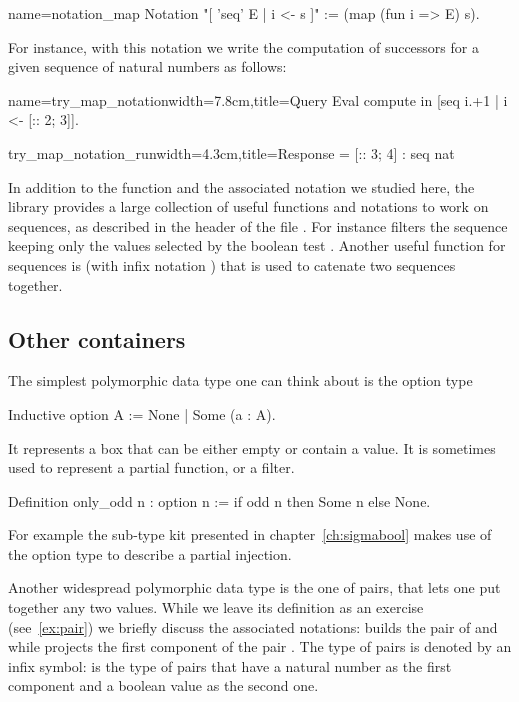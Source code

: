 \begin{coq}{name=notation_map}{}
Notation "[ 'seq' E | i <- s ]" := (map (fun i => E) s).
\end{coq}
For instance, with this notation we write the computation of successors
for a given sequence of natural numbers as follows:

\begin{coq}{name=try_map_notation}{width=7.8cm,title=Query}
Eval compute in [seq i.+1 | i <- [:: 2; 3]].
\end{coq}
\begin{coqout}{try_map_notation_run}{width=4.3cm,title=Response}
= [:: 3; 4] : seq nat
\end{coqout}
\index[coq]{\C{[seq .. "| .. <- ..]}}
In addition to the function  and the associated notation
we studied here, the \mcbMC{} library
provides a large collection of useful functions and notations to work on
sequences, as described in the header of the file .  For
instance \C{[seq i <- s | p]} filters the sequence  keeping only
the values selected by the boolean test .
Another useful function for sequences is  (with infix notation \C{++})
that is used to catenate two sequences together.
\index[coq]{\C{(_ ++ _)}}
\index[coq]{\C{[seq .. <- .. "| ..]}}

\subsection{Other containers}\label{sec:othercontainers}
The simplest polymorphic data type one can think about is the option type

\begin{coq}{}{}
Inductive option A := None | Some (a : A).
\end{coq}
It represents a box that can be either empty or contain a value.
It is sometimes used to represent a partial function, or a filter.

\begin{coq}{}{}
Definition only_odd n : option n := if odd n then Some n else None.
\end{coq}
For example the sub-type kit presented in chapter~\ref{ch:sigmabool} makes use
of the option type to describe a partial injection.

Another widespread polymorphic data type is the one of pairs, that
lets one put together any two values.  While we leave its definition
as an exercise (see~\ref{ex:pair}) we briefly discuss the associated
notations:  builds the pair of  and  while 
projects the first component of the pair .  The type of pairs is
denoted by an infix \C{*} symbol:  is the type of
pairs that have a natural number as the first component and a boolean
value as the second one.

